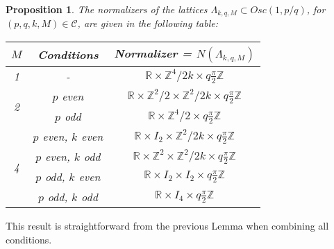 \documentclass[12pt]{amsart}
\theoremstyle{plain}
\newtheorem{prop}[thm]{Proposition}
\theoremstyle{definition}
\theoremstyle{remark}
\begin{document}
\begin{prop}
    The normalizers of the lattices $\Lambda_{k,q,M} \subset Osc(1,p/q)$, for $(p,q,k,M) \in \mathcal{C}$, are given in the following table:
\begin{center}
\def\arraystretch{1.5}
\begin{tabular}{ |c|c|c| } 
\hline
$M$ & Conditions & Normalizer = $N(\Lambda_{k,q,M})$ \\
\hline
\multirow{1}{1em}{1} & - & $\mathbb{R} \times \mathbb{Z}^4 / {2k} \times q \frac{\pi}{2} \mathbb{Z}$ \\ 
\hline
\multirow{2}{1em}{2} & $p$ even & $\mathbb{R} \times \mathbb{Z}^2/2 \times \mathbb{Z}^2 / {2k} \times q \frac{\pi}{2} \mathbb{Z}$ \\ 
&  $p$ odd & $\mathbb{R} \times \mathbb{Z}^4/2 \times q \frac{\pi}{2} \mathbb{Z}$ \\ 
\hline
\multirow{4}{1em}{4} & $p$ even, $k$ even & $\mathbb{R} \times I_2 \times \mathbb{Z}^2 / {2k} \times q \frac{\pi}{2} \mathbb{Z}$ \\ 
&  $p$ even, $k$ odd & $\mathbb{R} \times \mathbb{Z}^2 \times \mathbb{Z}^2 / {2k} \times q \frac{\pi}{2} \mathbb{Z}$ \\ 
&  $p$ odd, $k$ even & $\mathbb{R} \times I_2 \times I_2 \times q \frac{\pi}{2} \mathbb{Z}$\\ 
&  $p$ odd, $k$ odd & $\mathbb{R} \times I_4  \times q \frac{\pi}{2} \mathbb{Z}$ \\ 
\hline
\end{tabular}
\end{center}
\end{prop}

This result is straightforward from the previous Lemma when combining all conditions.


  
    
\end{document}
